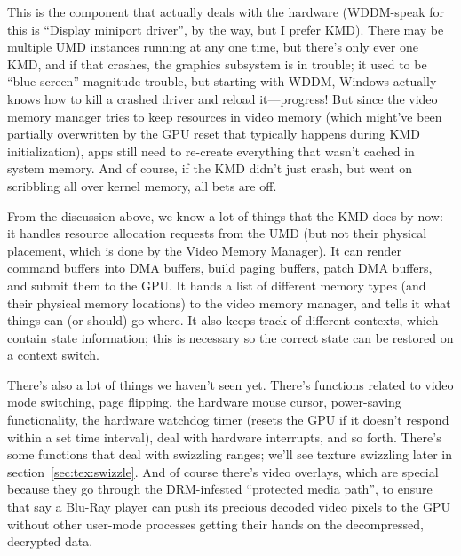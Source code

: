 This is the component that actually deals with the hardware (WDDM-speak for 
this is ``Display miniport driver'', by the way, but I prefer KMD).  There may 
be multiple
UMD instances running at any one time, but there's only ever one KMD, and if
that crashes, the graphics subsystem is in trouble; it used to be ``blue 
screen''-magnitude trouble, but starting with WDDM, Windows actually knows how 
to kill a crashed driver and reload it---progress! But since the video memory 
manager tries to keep resources in video memory (which might've been partially 
overwritten by the GPU reset that typically happens during KMD initialization), 
apps still need to re-create everything that wasn't cached in system memory.  
And of course, if the KMD didn't just crash, but went on scribbling all over 
kernel memory, all bets are off.

From the discussion above, we know a lot of things that the KMD does by now: it 
handles resource allocation requests from the UMD (but not their physical 
placement, which is done by the Video Memory Manager). It can render command 
buffers into DMA buffers, build paging buffers, patch DMA buffers, and submit 
them to the GPU. It hands a list of different memory types (and their physical 
memory locations) to the video memory manager, and tells it what things can (or 
should) go where. It also keeps track of different contexts, which contain 
state information; this is necessary so the correct state can be restored on 
a context switch.

There's also a lot of things we haven't seen yet. There's functions related to 
video mode switching, page flipping, the hardware mouse cursor, power-saving 
functionality, the hardware watchdog timer (resets the GPU if it doesn't 
respond within a set time interval), deal with hardware interrupts, and so 
forth.  There's some functions that deal with swizzling ranges; we'll see 
texture swizzling later in section~\ref{sec:tex:swizzle}. And of course there's 
video overlays, which are special because they go through the DRM-infested 
``protected media path'', to ensure that say a Blu-Ray player can push its 
precious decoded video pixels to the GPU without other user-mode processes 
getting their hands on the decompressed, decrypted data.

